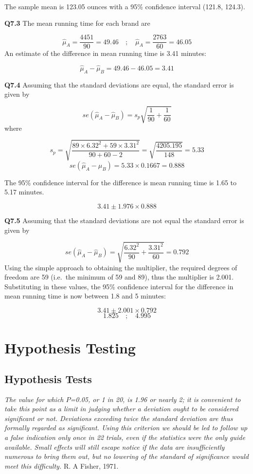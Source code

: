 \documentclass[
  oneside]{krantz}
\begin{document}
The sample mean is 123.05 ounces with a 95\% confidence interval (121.8, 124.3).

\textbf{Q7.3} The mean running time for each brand are

\[\hat \mu_A = \frac{4451}{90} = 49.46 \quad ; \quad \hat \mu_A = \frac{2763}{60} = 46.05 \]
An estimate of the difference in mean running time is 3.41 minutes:

\[ \hat \mu_A - \hat \mu_B = 49.46 - 46.05 = 3.41\]

\textbf{Q7.4} Assuming that the standard deviations are equal, the standard error is given by

\[se(\hat \mu_A - \hat \mu_B) = s_p \sqrt{\frac{1}{90} + \frac{1}{60}}\]
where

\[s_p = \sqrt{\frac{89 \times 6.32^2 + 59 \times 3.31^2}{90 + 60 -2}} = \sqrt{\frac{4205.195}{148}} = 5.33 \]
\[se(\hat \mu_A - \hat \mu_B) = 5.33 \times 0.1667 = 0.888\]

The 95\% confidence interval for the difference is mean running time is 1.65 to 5.17 minutes.

\[ 3.41 \pm 1.976 \times 0.888\]

\textbf{Q7.5} Assuming that the standard deviations are not equal the standard error is given by

\[se(\hat \mu_A - \hat \mu_B) = \sqrt{\frac{6.32^2}{90} + \frac{3.31^2}{60}} = 0.792\]
Using the simple approach to obtaining the multiplier, the required degrees of freedom are 59 (i.e.~the minimum of 59 and 89), thus the multiplier is 2.001. Substituting in these values, the 95\% confidence interval for the difference in mean running time is now between 1.8 and 5 minutes:

\[3.41 \pm 2.001 \times 0.792\]
\[ 1.825 \quad ; \quad 4.995\]

\hypertarget{part-hypothesis-testing}{%
\part{Hypothesis Testing}\label{part-hypothesis-testing}}

\hypertarget{hypothtests}{%
\chapter{Hypothesis Tests}\label{hypothtests}}

\emph{The value for which \(P\)=0.05, or 1 in 20, is 1.96 or nearly 2; it is convenient to take this point as a limit in judging whether a deviation ought to be considered significant or not. Deviations exceeding twice the standard deviation are thus formally regarded as significant. Using this criterion we should be led to follow up a false indication only once in 22 trials, even if the statistics were the only guide available. Small effects will still escape notice if the data are insufficiently numerous to bring them out, but no lowering of the standard of significance would meet this difficulty.}
R. A Fisher, 1971.
\end{document}
